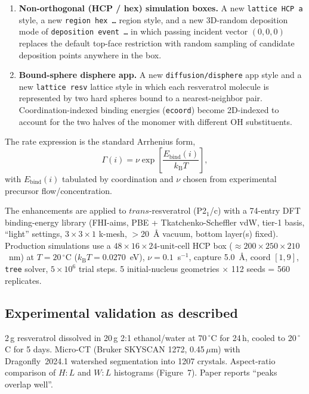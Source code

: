 \documentclass[11pt]{article}
\begin{document}
\begin{enumerate}
  \item \textbf{Non-orthogonal (HCP / hex) simulation boxes.} A new \texttt{lattice HCP a} style, a new \texttt{region hex \dots} region style, and a new 3D-random deposition mode of \texttt{deposition event \dots} in which passing incident vector $(0,0,0)$ replaces the default top-face restriction with random sampling of candidate deposition points anywhere in the box.
  \item \textbf{Bound-sphere disphere app.} A new \texttt{diffusion/disphere} app style and a new \texttt{lattice resv} lattice style in which each resveratrol molecule is represented by two hard spheres bound to a nearest-neighbor pair. Coordination-indexed binding energies (\texttt{ecoord}) become 2D-indexed to account for the two halves of the monomer with different OH substituents.
\end{enumerate}

The rate expression is the standard Arrhenius form,
\begin{equation}
\Gamma(i) = \nu \exp\!\left[\frac{E_\text{bind}(i)}{k_\text{B} T}\right],
\end{equation}
with $E_\text{bind}(i)$ tabulated by coordination and $\nu$ chosen from experimental precursor flow/concentration.

The enhancements are applied to $trans$-resveratrol (P2$_1$/c) with a 74-entry DFT binding-energy library (FHI-aims, PBE + Tkatchenko-Scheffler vdW, tier-1 basis, ``light'' settings, $3\!\times\!3\!\times\!1$ k-mesh, $>$20~\AA{} vacuum, bottom layer(s) fixed). Production simulations use a $48\!\times\!16\!\times\!24$-unit-cell HCP box ($\approx 200\!\times\!250\!\times\!210$~nm) at $T=20\,^\circ$C ($k_\text{B} T=0.0270$~eV), $\nu=0.1$~s$^{-1}$, capture 5.0~\AA, coord $[1,9]$, \texttt{tree} solver, $5\!\times\!10^6$ trial steps. 5 initial-nucleus geometries $\times$ 112 seeds = 560 replicates.

\subsection{Experimental validation as described}

2\,g resveratrol dissolved in 20\,g 2:1 ethanol/water at 70\,$^\circ$C for 24\,h, cooled to 20\,$^\circ$C for 5 days. Micro-CT (Bruker SKYSCAN 1272, 0.45\,$\mu$m) with Dragonfly~2024.1 watershed segmentation into 1207 crystals. Aspect-ratio comparison of $H\!:\!L$ and $W\!:\!L$ histograms (Figure~7). Paper reports ``peaks overlap well''.
\end{document}
